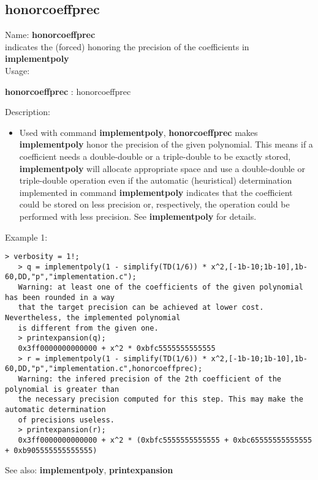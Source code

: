 \subsection{ honorcoeffprec }
\noindent Name: \textbf{honorcoeffprec}\\
indicates the (forced) honoring the precision of the coefficients in \textbf{implementpoly}\\

\noindent Usage: 
\begin{center}
\textbf{honorcoeffprec} : \textsf{honorcoeffprec}\\
\end{center}
\noindent Description: \begin{itemize}

\item Used with command \textbf{implementpoly}, \textbf{honorcoeffprec} makes \textbf{implementpoly} honor
   the precision of the given polynomial. This means if a coefficient
   needs a double-double or a triple-double to be exactly stored,
   \textbf{implementpoly} will allocate appropriate space and use a double-double
   or triple-double operation even if the automatic (heuristical)
   determination implemented in command \textbf{implementpoly} indicates that the
   coefficient could be stored on less precision or, respectively, the
   operation could be performed with less precision. See \textbf{implementpoly}
   for details.
\end{itemize}
\noindent Example 1: 
\begin{center}\begin{minipage}{14.8cm}\begin{Verbatim}[frame=single]
   > verbosity = 1!;
   > q = implementpoly(1 - simplify(TD(1/6)) * x^2,[-1b-10;1b-10],1b-60,DD,"p","implementation.c");
   Warning: at least one of the coefficients of the given polynomial has been rounded in a way
   that the target precision can be achieved at lower cost. Nevertheless, the implemented polynomial
   is different from the given one.
   > printexpansion(q);
   0x3ff0000000000000 + x^2 * 0xbfc5555555555555
   > r = implementpoly(1 - simplify(TD(1/6)) * x^2,[-1b-10;1b-10],1b-60,DD,"p","implementation.c",honorcoeffprec);
   Warning: the infered precision of the 2th coefficient of the polynomial is greater than
   the necessary precision computed for this step. This may make the automatic determination
   of precisions useless.
   > printexpansion(r);
   0x3ff0000000000000 + x^2 * (0xbfc5555555555555 + 0xbc65555555555555 + 0xb905555555555555)
\end{Verbatim}
\end{minipage}\end{center}
See also: \textbf{implementpoly}, \textbf{printexpansion}
